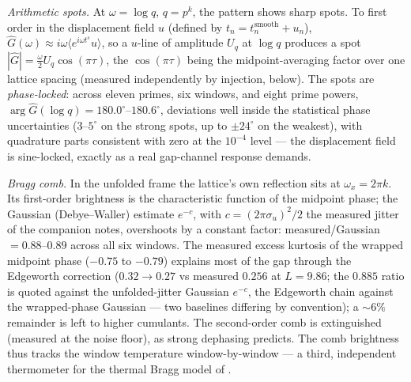 \documentclass[12pt]{amsart}
\begin{document}
\emph{Arithmetic spots.} At $\omega = \log q$, $q = p^k$, the pattern
shows sharp spots. To first order in the displacement field $u$
(defined by $t_n = t_n^{\mathrm{smooth}} + u_n$),
$\hat G(\omega) \approx i\omega \langle e^{i\omega t^{s}} u\rangle$, so
a $u$-line of amplitude $U_q$ at $\log q$ produces a spot
$|\hat G| = \tfrac{\omega}{2} U_q \cos(\pi\tau)$, the $\cos(\pi\tau)$
being the midpoint-averaging factor over one lattice spacing
(measured independently by injection, below). The spots are
\emph{phase-locked}: across eleven primes, six windows, and eight prime
powers, $\arg \hat G(\log q) = 180.0^\circ$--$180.6^\circ$,
deviations well inside the statistical phase uncertainties ($3$--$5^\circ$
on the strong spots, up to $\pm 24^\circ$ on the weakest), with
quadrature parts consistent with zero at the $10^{-4}$ level --- the
displacement field is sine-locked, exactly as a real gap-channel
response demands.

\emph{Bragg comb.} In the unfolded frame the lattice's own reflection
sits at $\omega_x = 2\pi k$. Its first-order brightness is the
characteristic function of the midpoint phase; the Gaussian
(Debye--Waller) estimate $e^{-c}$, with $c = (2\pi\sigma_u)^2/2$ the
measured jitter of the companion notes, overshoots by a constant factor:
measured/Gaussian $= 0.88$--$0.89$ across all six windows. The measured
excess kurtosis of the wrapped midpoint phase ($-0.75$ to $-0.79$)
explains most of the gap through the Edgeworth correction
($0.32 \to 0.27$ vs measured $0.256$ at $L = 9.86$; the $0.885$ ratio
is quoted against the unfolded-jitter Gaussian $e^{-c}$, the Edgeworth
chain against the wrapped-phase Gaussian --- two baselines differing by
convention); a $\sim 6\%$
remainder is left to higher cumulants. The second-order comb is
extinguished (measured at the noise floor), as strong dephasing
predicts. The comb brightness thus tracks the window temperature
window-by-window --- a third, independent thermometer for the thermal
Bragg model of \cite{companion3}.
\end{document}
